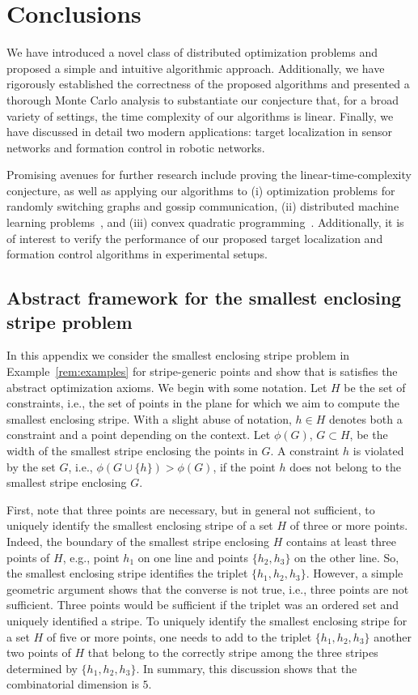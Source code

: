 \documentclass[onecolumn,journal,letterpaper]{IEEEtran}
\newcommand{\union}{\cup}
\begin{document}
\section{Conclusions}

We have introduced a novel class of distributed optimization problems and
proposed a simple and intuitive algorithmic approach. Additionally, we have
rigorously established the correctness of the proposed algorithms and
presented a thorough Monte Carlo analysis to substantiate our conjecture
that, for a broad variety of settings, the time complexity of our
algorithms is linear. Finally, we have discussed in detail two modern
applications: target localization in sensor networks and formation control
in robotic networks.

Promising avenues for further research include proving the
linear-time-complexity conjecture, as well as applying our algorithms to
(i) optimization problems for randomly switching graphs and gossip
communication, (ii) distributed machine learning
problems~\cite{JB-YD-JT-OW:08,YL-VR-LV:08,KF-BBL-PT:06}, and (iii) convex
quadratic programming~\cite{RG:99}. Additionally, it is of interest to
verify the performance of our proposed target localization and formation
control algorithms in experimental setups.

\appendix

\subsection*{Abstract framework for the smallest enclosing stripe problem}
In this appendix we consider the smallest enclosing stripe problem in
Example~\ref{rem:examples} for stripe-generic points and show that is
satisfies the abstract optimization axioms. We begin with some notation.
Let $H$ be the set of constraints, i.e., the set of points in the plane for
which we aim to compute the smallest enclosing stripe. With a slight abuse
of notation, $h\in H$ denotes both a constraint and a point depending on
the context.  Let $\phi(G)$, $G\subset H$, be the width of the smallest
stripe enclosing the points in $G$. A constraint $h$ is violated by the set
$G$, i.e., $\phi(G\union \{h\})>\phi(G)$, if the point $h$ does not belong
to the smallest stripe enclosing $G$.

First, note that three points are necessary, but in general not sufficient,
to uniquely identify the smallest enclosing stripe of a set $H$ of three or
more points. Indeed, the boundary of the smallest stripe enclosing $H$
contains at least three points of $H$, e.g., point $h_1$ on one line and
points $\{h_2,h_3\}$ on the other line. So, the smallest enclosing stripe
identifies the triplet $\{h_1,h_2,h_3\}$. However, a simple geometric
argument shows that the converse is not true, i.e., three points are not
sufficient. Three points would be sufficient if the triplet was an ordered
set and uniquely identified a stripe.
To uniquely identify the smallest enclosing stripe for a set $H$ of five or
more points, one needs to add to the triplet $\{h_1,h_2,h_3\}$ another two
points of $H$ that belong to the correctly stripe among the three stripes
determined by $\{h_1,h_2,h_3\}$.  In summary, this discussion shows that
the combinatorial dimension is $5$.
\end{document}
